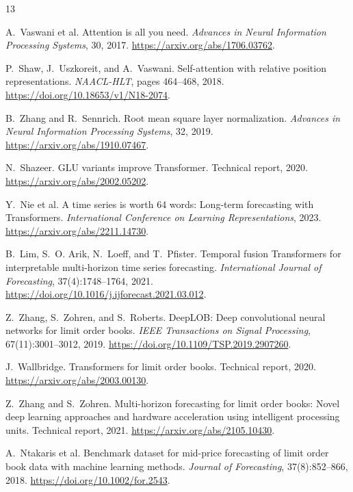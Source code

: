 \documentclass[10pt,letterpaper]{article}
\numberwithin{equation}{section}
\theoremstyle{definition}
\theoremstyle{remark}
\begin{document}
\begin{thebibliography}{13}

A.~Vaswani et al.
\newblock Attention is all you need.
\newblock \emph{Advances in Neural Information Processing Systems}, 30, 2017.
\newblock \url{https://arxiv.org/abs/1706.03762}.

P.~Shaw, J.~Uszkoreit, and A.~Vaswani.
\newblock Self-attention with relative position representations.
\newblock \emph{NAACL-HLT}, pages 464--468, 2018.
\newblock \url{https://doi.org/10.18653/v1/N18-2074}.

B.~Zhang and R.~Sennrich.
\newblock Root mean square layer normalization.
\newblock \emph{Advances in Neural Information Processing Systems}, 32, 2019.
\newblock \url{https://arxiv.org/abs/1910.07467}.

N.~Shazeer.
\newblock GLU variants improve Transformer.
\newblock Technical report, 2020.
\newblock \url{https://arxiv.org/abs/2002.05202}.

Y.~Nie et al.
\newblock A time series is worth 64 words: Long-term forecasting with
Transformers.
\newblock \emph{International Conference on Learning Representations}, 2023.
\newblock \url{https://arxiv.org/abs/2211.14730}.

B.~Lim, S.~O. Arik, N.~Loeff, and T.~Pfister.
\newblock Temporal fusion Transformers for interpretable multi-horizon time
series forecasting.
\newblock \emph{International Journal of Forecasting}, 37(4):1748--1764, 2021.
\newblock \url{https://doi.org/10.1016/j.ijforecast.2021.03.012}.

Z.~Zhang, S.~Zohren, and S.~Roberts.
\newblock DeepLOB: Deep convolutional neural networks for limit order books.
\newblock \emph{IEEE Transactions on Signal Processing}, 67(11):3001--3012,
2019.
\newblock \url{https://doi.org/10.1109/TSP.2019.2907260}.

J.~Wallbridge.
\newblock Transformers for limit order books.
\newblock Technical report, 2020.
\newblock \url{https://arxiv.org/abs/2003.00130}.

Z.~Zhang and S.~Zohren.
\newblock Multi-horizon forecasting for limit order books: Novel deep learning
approaches and hardware acceleration using intelligent processing units.
\newblock Technical report, 2021.
\newblock \url{https://arxiv.org/abs/2105.10430}.

A.~Ntakaris et al.
\newblock Benchmark dataset for mid-price forecasting of limit order book data
with machine learning methods.
\newblock \emph{Journal of Forecasting}, 37(8):852--866, 2018.
\newblock \url{https://doi.org/10.1002/for.2543}.


\end{thebibliography}
\end{document}
